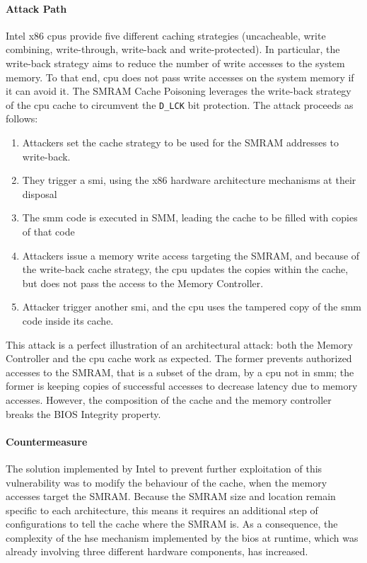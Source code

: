\paragraph{Attack Path}
%
Intel x86 \acp{cpu} provide five different caching strategies (uncacheable,
write combining, write-through, write-back and write-protected).
%
In particular, the write-back strategy aims to reduce the number of write
accesses to the system memory.
%
To that end, \ac{cpu} does not pass write accesses on the system memory if it
can avoid it.
%
The SMRAM Cache Poisoning leverages the write-back strategy of the \ac{cpu}
cache to circumvent the \texttt{D\_LCK} bit protection.
%
The attack proceeds as follows:

\begin{enumerate}
\item Attackers set the cache strategy to be used for the SMRAM addresses to
  write-back.
%
\item They trigger a \ac{smi}, using the x86 hardware architecture mechanisms at
  their disposal
%
\item The \ac{smm} code is executed in SMM, leading the cache to be filled with
  copies of that code
%
\item Attackers issue a memory write access targeting the SMRAM, and because of
  the write-back cache strategy, the \ac{cpu} updates the copies within the
  cache, but does not pass the access to the Memory Controller.
%
\item Attacker trigger another \ac{smi}, and the \ac{cpu} uses the tampered copy
  of the \ac{smm} code inside its cache.
\end{enumerate}
%
This attack is a perfect illustration of an architectural attack:
%
both the Memory Controller and the \ac{cpu} cache work as expected.
%
The former prevents authorized accesses to the SMRAM, that is a subset of the
\ac{dram}, by a \ac{cpu} not in \ac{smm};
%
the former is keeping copies of successful accesses to decrease latency due to memory
accesses.
%
However, the composition of the cache and the memory controller breaks the BIOS
Integrity property.

\paragraph{Countermeasure}
%
The solution implemented by Intel to prevent further exploitation of this
vulnerability was to modify the behaviour of the cache, when the memory accesses
target the SMRAM.
%
Because the SMRAM size and location remain specific to each architecture, this
means it requires an additional step of configurations to tell the cache where
the SMRAM is.
%
As a consequence, the complexity of the \ac{hse} mechanism implemented by the
\ac{bios} at runtime, which was already involving three different hardware
components, has increased.

